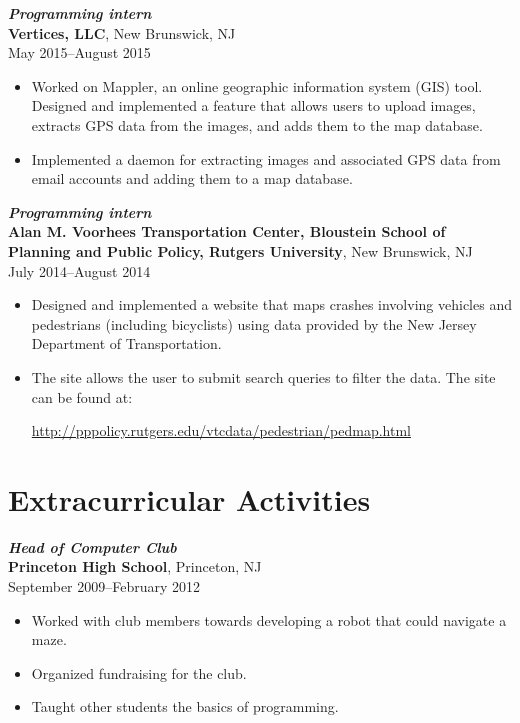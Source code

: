 \documentclass[letterpaper,12pt]{article}
\begin{document}
\textit{\textbf{Programming intern}} \\
\textbf{Vertices, LLC}, New Brunswick, NJ \\
May 2015--August 2015
\begin{itemize}
\item Worked on Mappler, an online geographic information system (GIS)
  tool. Designed and implemented a feature that allows users to upload
  images, extracts GPS data from the images, and adds them to the map
  database.
\item Implemented a daemon for extracting images and associated GPS
  data from email accounts and adding them to a map database.
\end{itemize}

\textit{\textbf{Programming intern}} \\
\textbf{Alan M. Voorhees Transportation Center, Bloustein School of
  Planning and Public Policy, Rutgers University},
New Brunswick, NJ \\
July 2014--August 2014
\begin{itemize}
\item Designed and implemented a website that maps crashes involving
  vehicles and pedestrians (including bicyclists) using data provided
  by the New Jersey Department of Transportation.
\item The site allows the user to submit search queries to filter the
  data. The site can be found at:
  \begin{center}
    \url{http://pppolicy.rutgers.edu/vtcdata/pedestrian/pedmap.html}
  \end{center}
\end{itemize}

\section*{Extracurricular Activities}

\textit{\textbf{Head of Computer Club}} \\
\textbf{Princeton High School},
Princeton, NJ \\
September 2009--February 2012
\begin{itemize}
\item Worked with club members towards developing a robot that could
  navigate a maze.
\item Organized fundraising for the club.
\item Taught other students the basics of programming.
\end{itemize}
\end{document}
